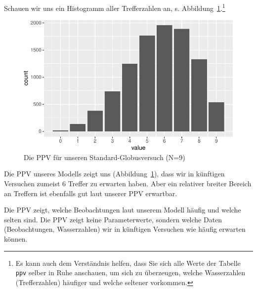 \documentclass[
  a4paper,
  DIV=11]{scrreprt}
\theoremstyle{definition}
\theoremstyle{remark}
\begin{document}
Schauen wir uns ein Histogramm aller Trefferzahlen an, s.
Abbildung~\ref{fig-ppv2}.\footnote{Es kann auch dem Verständnis helfen,
  dass Sie sich alle Werte der Tabelle \texttt{ppv} selber in Ruhe
  anschauen, um sich zu überzeugen, welche Wasserzahlen (Trefferzahlen)
  häufiger und welche seltener vorkommen.}

\begin{figure}

{\centering \includegraphics{./ppv_files/figure-pdf/fig-ppv2-1.pdf}

}

\caption{\label{fig-ppv2}Die PPV für unseren Standard-Globusversuch
(N=9)}

\end{figure}

Die PPV unseres Modells zeigt uns (Abbildung~\ref{fig-ppv2}), dass wir
in künftigen Versuchen zumeist 6 Treffer zu erwarten haben. Aber ein
relativer breiter Bereich an Treffern ist ebenfalls gut laut unserer PPV
erwartbar.

\begin{tcolorbox}[enhanced jigsaw, colframe=quarto-callout-important-color-frame, title=\textcolor{quarto-callout-important-color}{\faExclamation}\hspace{0.5em}{Wichtig}, breakable, leftrule=.75mm, coltitle=black, toptitle=1mm, bottomrule=.15mm, bottomtitle=1mm, opacityback=0, arc=.35mm, rightrule=.15mm, left=2mm, colbacktitle=quarto-callout-important-color!10!white, opacitybacktitle=0.6, toprule=.15mm, titlerule=0mm, colback=white]
Die PPV zeigt, welche Beobachtungen laut unserem Modell häufig und
welche selten sind. Die PPV zeigt keine Parameterwerte, sondern welche
Daten (Beobachtungen, Wasserzahlen) wir in künftigen Versuchen wie
häufig erwarten können.
\end{tcolorbox}
\end{document}
